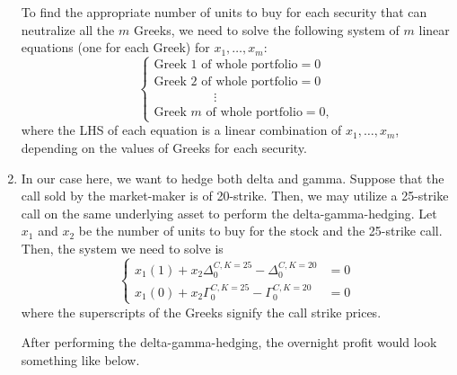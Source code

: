 \begin{enumerate}
To find the appropriate number of units to buy for each security that can
neutralize all the \(m\) Greeks, we need to solve the following system of \(m\)
linear equations (one for each Greek) for \(x_1,\dotsc,x_m\):
\[
\begin{cases}
\text{Greek 1 of whole portfolio}=0 \\
\text{Greek 2 of whole portfolio}=0 \\
\hspace{2cm}\vdots \\
\text{Greek \(m\) of whole portfolio}=0,
\end{cases}
\]
where the LHS of each equation is a linear combination of \(x_1,\dotsc,x_m\),
depending on the values of Greeks for each security.

\item In our case here, we want to hedge both delta and gamma. Suppose that the
call sold by the market-maker is of 20-strike. Then, we may utilize a 25-strike
call on the same underlying asset to perform the delta-gamma-hedging. Let
\(x_1\) and \(x_2\) be the number of units to buy for the stock and the
25-strike call. Then, the system we need to solve is
\[
\begin{cases}
x_1(1)+x_2\Delta_0^{C, K=25}-\Delta_0^{C, K=20}&=0 \\
x_1(0)+x_2\Gamma_0^{C, K=25}-\Gamma_0^{C, K=20}&=0
\end{cases}
\]
where the superscripts of the Greeks signify the call strike prices.

After performing the delta-gamma-hedging, the overnight profit would look
something like below.


\end{enumerate}
